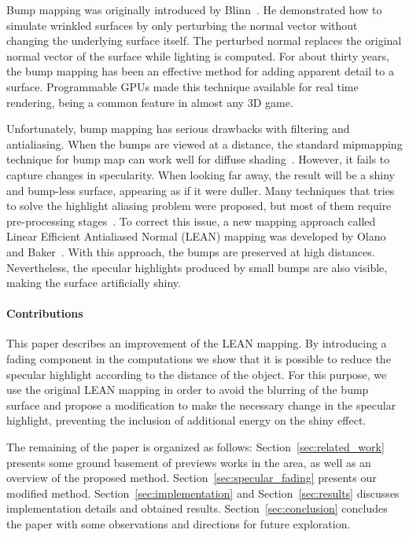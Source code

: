 \documentclass[10pt, conference]{IEEEtran}
\begin{document}
Bump mapping was originally introduced by Blinn~\cite{Blinn:1978:SWS:800248.507101}. He demonstrated how to simulate wrinkled surfaces by only perturbing the normal vector without changing the underlying surface itself. The perturbed normal replaces the original normal vector of the surface while lighting is computed. For about thirty years, the bump mapping has been an effective method for adding apparent detail to a surface. Programmable GPUs made this technique available for real time rendering, being a common feature in almost any 3D game.

Unfortunately, bump mapping has serious drawbacks with filtering and antialiasing. When the bumps are viewed at a distance, the standard mipmapping technique for bump map can work well for diffuse shading~\cite{Kilgard00apractical}. However, it fails to capture changes in specularity. When looking far away, the result will be a shiny and bump-less surface, appearing as if it were duller. Many techniques that tries to solve the highlight aliasing problem were proposed, but most of them require pre-processing stages~\cite{Cabral:1987:BRF:37401.37434, Becker:1993:STB:166117.166141, Westin:1992:PRF:133994.134075}. To correct this issue, a new mapping approach called Linear Efficient Antialiased Normal (LEAN) mapping was developed by Olano and Baker~\cite{Olano:2010:LM:1730804.1730834}. With this approach, the bumps are preserved at high distances. Nevertheless, the specular highlights produced by small bumps are also visible, making the surface artificially shiny.


\paragraph*{Contributions}
%
This paper describes an improvement of the LEAN mapping. By introducing a fading component in the computations we show that it is possible to reduce the specular highlight according to the distance of the object. For this purpose, we use the original LEAN mapping in order to avoid the blurring of the bump surface and propose a modification to make the necessary change in the specular highlight, preventing the inclusion of additional energy on the shiny effect.

The remaining of the paper is organized as follows: Section~\ref{sec:related_work} presents some ground basement of previews works in the area, as well as an overview of the proposed method. Section~\ref{sec:specular_fading} presents our modified method. Section~\ref{sec:implementation} and Section~\ref{sec:results} discusses implementation details and obtained results. Section~\ref{sec:conclusion} concludes the paper with some observations and directions for future exploration.
\end{document}
